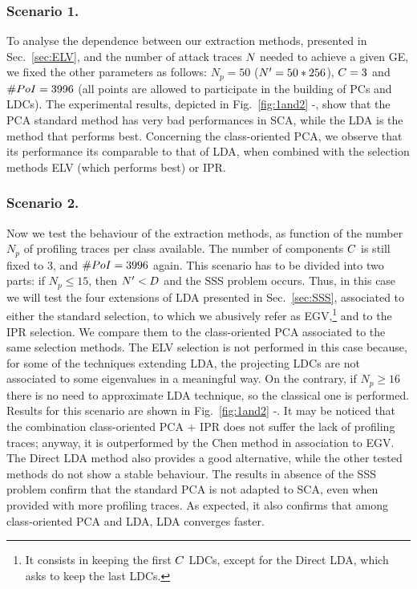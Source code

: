 \subsubsection{Scenario 1.}
To analyse the dependence between our extraction methods, presented in Sec.~\ref{sec:ELV}, and the number of attack traces $\numTraces[]$ needed to achieve a given GE, we fixed the other parameters as follows: $N_p=50$ ($\numTraces[]'=50*256$), $\newTraceLength = 3$ and $\numPoI = 3996$ (all points are allowed to participate in the building of PCs and LDCs). The experimental results, depicted in Fig.~\ref{fig:1and2} -, show that the PCA standard method has very bad performances in SCA, while the LDA is the method that performs best. Concerning the class-oriented PCA, we observe that its performance its comparable to that of LDA, when combined with the selection methods ELV (which performs best) or IPR.  


\subsubsection{Scenario 2.}
Now we test the behaviour of the extraction methods, as function of the number $N_p$ of profiling traces per class available. The number of components $\newTraceLength$ is still fixed to 3, and $\numPoI=3996$ again. This scenario has to be divided into two parts: if $N_p\leq 15$, then $\numTraces[]'<\traceLength$ and the SSS problem occurs. Thus, in this case we will test the four extensions of LDA presented in Sec.~\ref{sec:SSS}, associated to either the standard selection, to which we abusively refer as EGV,\footnote{It consists in keeping the first $\newTraceLength$ LDCs, except for the Direct LDA, which asks to keep the last LDCs.} and to the IPR selection.  We compare them to the class-oriented PCA associated to the same selection methods. The ELV selection is not performed in this case because, for some of the techniques extending LDA, the projecting LDCs are not associated to some eigenvalues in a meaningful way. On the contrary, if $N_p\geq 16$ there is no need to approximate LDA technique, so the classical one is performed. Results for this scenario are shown in Fig.~\ref{fig:1and2} -. It may be noticed that the combination class-oriented PCA + IPR does not suffer the lack of profiling traces; anyway, it is outperformed by the Chen method in association to EGV. The Direct LDA method also provides a good alternative, while the other tested methods do not show a stable behaviour. The results in absence of the SSS problem confirm that the standard PCA is not adapted to SCA, even when provided with more profiling traces. As expected, it also confirms that among class-oriented PCA and LDA, LDA converges faster.



